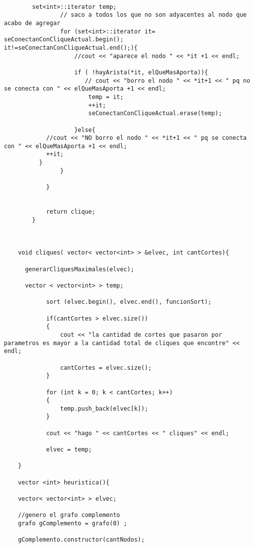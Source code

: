\begin{lstlisting}
        
        set<int>::iterator temp;
                // saco a todos los que no son adyacentes al nodo que acabo de agregar
                for (set<int>::iterator it= seConectanConCliqueActual.begin(); it!=seConectanConCliqueActual.end();){       
                    //cout << "aparece el nodo " << *it +1 << endl;
                        
                    if ( !hayArista(*it, elQueMasAporta)){
                       // cout << "borro el nodo " << *it+1 << " pq no se conecta con " << elQueMasAporta +1 << endl;
                        temp = it;
                        ++it;
                        seConectanConCliqueActual.erase(temp);
                        
                    }else{
            //cout << "NO borro el nodo " << *it+1 << " pq se conecta con " << elQueMasAporta +1 << endl;
            ++it;
          }
                }

            }
        
    
            return clique;
        }


    
    void cliques( vector< vector<int> > &elvec, int cantCortes){
     
      generarCliquesMaximales(elvec);
      
      vector < vector<int> > temp;
            
            sort (elvec.begin(), elvec.end(), funcionSort); 
            
            if(cantCortes > elvec.size())
            {
                cout << "la cantidad de cortes que pasaron por parametros es mayor a la cantidad total de cliques que encontre" << endl;
 
                cantCortes = elvec.size();
            }

            for (int k = 0; k < cantCortes; k++)
            {
                temp.push_back(elvec[k]);
            }

            cout << "hago " << cantCortes << " cliques" << endl;
            
            elvec = temp;
      
    }

    vector <int> heuristica(){
    
    vector< vector<int> > elvec;
    
    //genero el grafo complemento
    grafo gComplemento = grafo(0) ;
    
    gComplemento.constructor(cantNodos);
    

\end{lstlisting}
